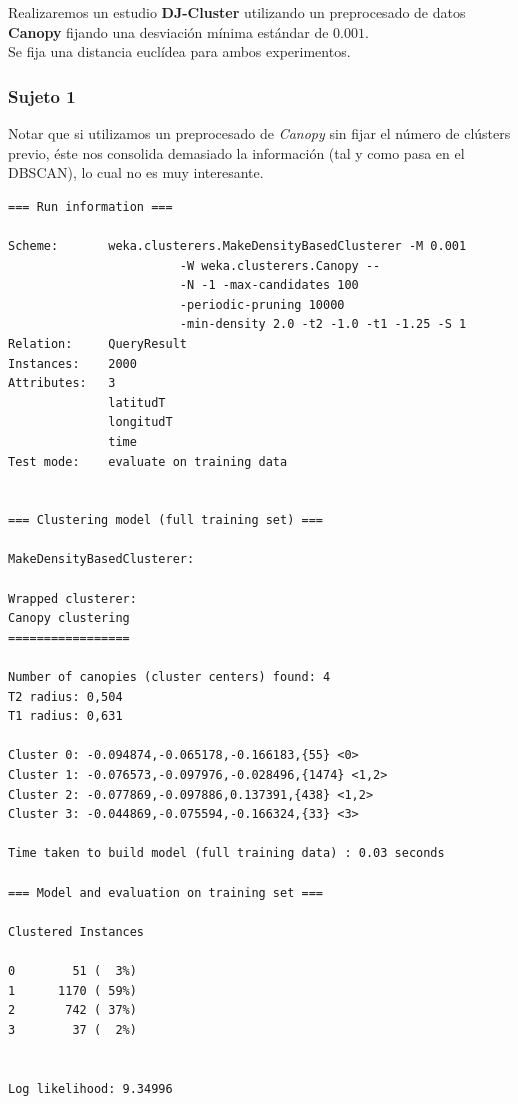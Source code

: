\documentclass[a4paper, 12pt, spanish]{article}
\begin{document}
Realizaremos un estudio \textbf{DJ-Cluster} utilizando un preprocesado de datos \textbf{Canopy} fijando una desviaci\'on m\'inima est\'andar de $0.001$. \\

Se fija una distancia eucl\'idea para ambos experimentos.\\

\subsubsection{Sujeto 1}

Notar que si utilizamos un preprocesado de \textit{Canopy} sin fijar el n\'umero de cl\'usters previo, \'este nos consolida demasiado la informaci\'on (tal y como pasa en el DBSCAN), lo cual no es muy interesante.\\

\begin{verbatim}
=== Run information ===

Scheme:       weka.clusterers.MakeDensityBasedClusterer -M 0.001 
						-W weka.clusterers.Canopy -- 
						-N -1 -max-candidates 100 
						-periodic-pruning 10000 
						-min-density 2.0 -t2 -1.0 -t1 -1.25 -S 1
Relation:     QueryResult
Instances:    2000
Attributes:   3
              latitudT
              longitudT
              time
Test mode:    evaluate on training data


=== Clustering model (full training set) ===

MakeDensityBasedClusterer: 

Wrapped clusterer: 
Canopy clustering
=================

Number of canopies (cluster centers) found: 4
T2 radius: 0,504     
T1 radius: 0,631     

Cluster 0: -0.094874,-0.065178,-0.166183,{55} <0>
Cluster 1: -0.076573,-0.097976,-0.028496,{1474} <1,2>
Cluster 2: -0.077869,-0.097886,0.137391,{438} <1,2>
Cluster 3: -0.044869,-0.075594,-0.166324,{33} <3>

Time taken to build model (full training data) : 0.03 seconds

=== Model and evaluation on training set ===

Clustered Instances

0        51 (  3%)
1      1170 ( 59%)
2       742 ( 37%)
3        37 (  2%)


Log likelihood: 9.34996
\end{verbatim}
\end{document}
